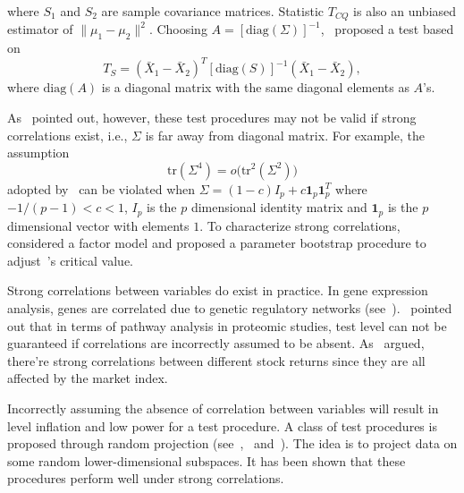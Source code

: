 \documentclass[review]{elsarticle}
\theoremstyle{plain}
\theoremstyle{definition}
\theoremstyle{remark}
\begin{document}
where $S_1$ and $S_2$ are sample covariance matrices. Statistic $T_{CQ}$ 
is also an unbiased estimator of $\|\mu_1-\mu_2\|^2$. Choosing $A={[\mathrm{diag}(\Sigma)]}^{-1}$,~\cite{Srivastava2008A} proposed a test based on
\begin{equation*}
    T_{S}={(\bar{X}_1-\bar{X}_2)}^T {[\mathrm{diag}(S)]}^{-1}(\bar{X}_1-\bar{X}_2),
\end{equation*}
where $\textrm{diag} (A)$ is a diagonal matrix with the same diagonal elements as $A$'s.

As~\cite{Ma2015A} pointed out, however, these test procedures may not be valid if strong correlations exist, i.e., $\Sigma$ is far away from diagonal matrix. For example, the assumption 
\begin{equation}\label{chenscondition}
    \mathrm{tr}(\Sigma^4)=o\big(\mathrm{tr}^2(\Sigma^2)\big)
\end{equation}
adopted by~\cite{Chen2010A} can be violated when $\Sigma=(1-c)I_p+c\bm{1}_p \bm{1}_p^T$ where $-{1}/{(p-1)}<c<1$, $I_p$ is the $p$ dimensional identity matrix and $\bm{1}_p$ is the $p$ dimensional vector  with elements $1$.
To characterize strong correlations,~\cite{Ma2015A} considered a factor model and proposed a parameter bootstrap procedure to adjust~\cite{Chen2010A}'s critical value.

Strong correlations between variables do exist in practice. In gene expression analysis, genes are correlated due to genetic regulatory networks (see~\cite{Thulin2014A}).~\cite{Chen2011A} pointed out that in terms of pathway analysis in proteomic studies,  test level can not be guaranteed if correlations are incorrectly assumed to be absent.
 As~\cite{Ma2015A} argued, there're strong correlations between different stock returns since they are all affected by the market index.

Incorrectly assuming the absence of correlation between variables will result in level inflation and low power for a test procedure. A class of test procedures is proposed through random projection (see~\cite{Lopes2015A},~\cite{Thulin2014A} and~\cite{Srivastava2014RAPTT}). The idea is to project data on some random lower-dimensional subspaces. It has been shown that these
procedures perform well under strong correlations. 
\end{document}
